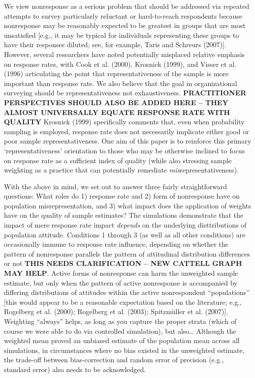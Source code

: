 \documentclass[
  man,mask]{apa7}
\begin{document}
We view nonresponse as a serious problem that should be addressed via repeated attempts to survey particularly reluctant or hard-to-reach respondents because nonresponse may be reasonably expected to be greatest in groups that are most unsatisfied {[}e.g., it may be typical for individuals representing these groups to have their responses diluted; see, for example, Taris and Schreurs (2007){]}. However, several researchers have noted potentially misplaced relative emphasis on response rates, with Cook et al. (2000), Krosnick (1999), and Visser et al. (1996) articulating the point that representativeness of the sample is more important than response rate. We also believe that the goal in organizational surveying should be representativeness not exhaustiveness. \textbf{PRACTITIONER PERSPECTIVES SHOULD ALSO BE ADDED HERE -- THEY ALMOST UNIVERSALLY EQUATE RESPONSE RATE WITH QUALITY} Krosnick (1999) specifically comments that, even when probability sampling is employed, response rate does not necessarily implicate either good or poor sample representativeness. One aim of this paper is to reinforce this primary `representativeness' orientation to those who may be otherwise inclined to focus on response rate as a sufficient index of quality (while also stressing sample weighting as a practice that can potentially remediate \emph{mis}representativeness).

With the above in mind, we set out to answer three fairly straightforward questions: What roles do 1) response rate and 2) form of nonresponse have on population misrepresentation, and 3) what impact does the application of weights have on the quality of sample estimates? The simulations demonstrate that the impact of mere response rate impact \emph{depends} on the underlying disttributions of population attitude. Conditions 1 through 3 (as well as all other conditions) are occasionally immune to response rate influence, depending on whether the pattern of nonresponse parallels the pattern of attitudinal distribution differences or not \textbf{THIS NEEDS CLARIFICATION -- NEW CATTELL GRAPH MAY HELP}. Active forms of nonresponse can harm the unweighted sample estimate, but only when the pattern of active nonresponse is accompanied by differing distributions of attitudes within the active nonrespondent ``populations'' {[}this would appear to be a reasonable expectation based on the literature; e.g., Rogelberg et al. (2000); Rogelberg et al. (2003); Spitzmüller et al. (2007){]}. Weighting ``always'' helps, as long as you capture the proper strata (which of course we were able to do via controlled simulation), but also\ldots{} Although the weighted mean proved an unbiased estimate of the population mean across all simulations, in circumstances where no bias existed in the unweighted estimate, the trade-off between bias-correction and random error of precision (e.g., standard error) also needs to be acknowledged.
\end{document}
